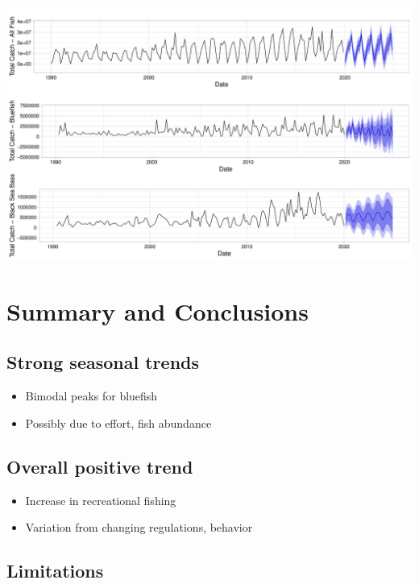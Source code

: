 \documentclass[
  12pt,
]{article}
\providecommand{\tightlist}{%
  \setlength{\itemsep}{0pt}\setlength{\parskip}{0pt}}
\begin{document}
\includegraphics{Report_FishTrends_files/figure-latex/unnamed-chunk-7-1.pdf}

\newpage

\hypertarget{summary-and-conclusions}{%
\section{Summary and Conclusions}\label{summary-and-conclusions}}

\hypertarget{strong-seasonal-trends}{%
\subsection{Strong seasonal trends}\label{strong-seasonal-trends}}

\begin{itemize}
\tightlist
\item
  Bimodal peaks for bluefish
\item
  Possibly due to effort, fish abundance
\end{itemize}

\hypertarget{overall-positive-trend}{%
\subsection{Overall positive trend}\label{overall-positive-trend}}

\begin{itemize}
\tightlist
\item
  Increase in recreational fishing
\item
  Variation from changing regulations, behavior
\end{itemize}

\hypertarget{limitations}{%
\subsection{Limitations}\label{limitations}}
\end{document}
